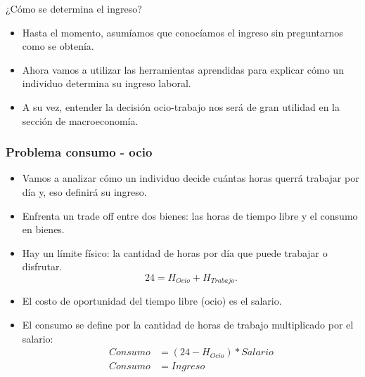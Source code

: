 \documentclass{beamer}
\begin{document}
\begin{frame}{¿Cómo se determina el ingreso?}
    \begin{itemize}
        \item Hasta el momento, asumíamos que  conocíamos el ingreso sin preguntarnos como se obtenía. 
        \item Ahora vamos a utilizar las herramientas aprendidas para explicar cómo un individuo determina su ingreso laboral.
        \item A su vez, entender la decisión ocio-trabajo nos será de gran utilidad en la sección de macroeconomía. 
    \end{itemize}
\end{frame}


\begin{frame}
\frametitle{Problema consumo - ocio}
\begin{itemize}
    \item Vamos a analizar cómo un individuo decide cuántas horas querrá trabajar por día y, eso definirá su ingreso.
    \item Enfrenta un trade off entre dos bienes: las horas de tiempo libre y el consumo en bienes.
    \item Hay un límite físico: la cantidad de horas por día que puede trabajar o disfrutar.
    \begin{equation}
      24 = H_{Ocio} + H_{Trabajo}.
    \end{equation}
    \item El costo de oportunidad del tiempo libre (ocio) es el salario. 
    \item El consumo se define por la cantidad de horas de trabajo multiplicado por el salario:
    \begin{align*}
      Consumo &= (24-H_{Ocio}) * Salario \\
      Consumo &= Ingreso 
    \end{align*}
\end{itemize}
\end{frame}
\end{document}
